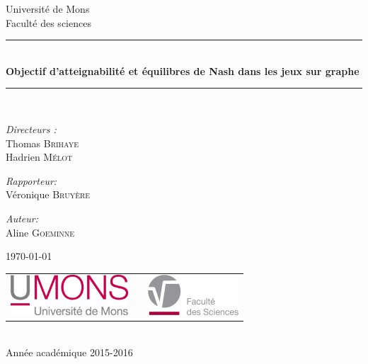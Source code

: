 \documentclass[]{article}
\begin{document}
\begin{titlepage}
\begin{center}

{\Large Université de Mons}\\[1ex]
{\Large Faculté des sciences}\\[2.5cm]

\newcommand{\HRule}{\rule{\linewidth}{0.3mm}}
\HRule \\[0.3cm]
{ \LARGE \bfseries Objectif d'atteignabilité et équilibres de Nash dans les jeux sur graphe \\[0.3cm]}
\HRule \\[1.5cm]


\begin{center}
	\emph{Directeurs :}\\
	 Thomas \textsc{Brihaye} \\
	 Hadrien \textsc{Mélot}

\end{center}

\begin{center}
	\emph{Rapporteur:}\\
	Véronique \textsc{Bruyère}
\end{center}

\begin{center}
\emph{Auteur:} \\
Aline \textsc{Goeminne}
\end{center}
\vfill
\today
\vfill

\begin{center}
\begin{tabular}[t]{c c c}
\includegraphics[height=1.5cm]{umons.jpg} &
\hspace{0.3cm} &
\includegraphics[height=1.5cm]{fac.jpg}
\end{tabular}
\end{center}~\\

{\large Année académique 2015-2016}

\end{center}
\end{titlepage}
\end{document}
